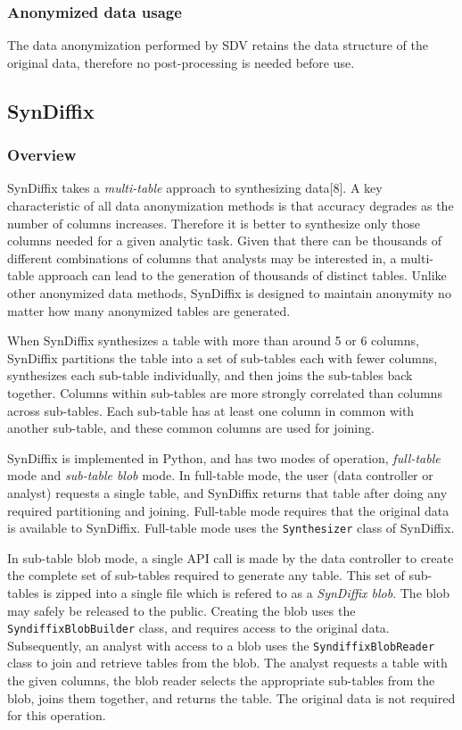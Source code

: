 \documentclass[10pt]{article}
\newcommand{\mycite}[1]{[#1]}
\begin{document}
\subsubsection*{Anonymized data usage}

The data anonymization performed by SDV retains the data structure of the original data, therefore no post-processing is needed before use.

\subsection*{SynDiffix}
\label{sec:method_sdx}

\subsubsection*{Overview}

SynDiffix takes a \textit{multi-table} approach to synthesizing data\mycite{8}. A key characteristic of all data anonymization methods is that accuracy degrades as the number of columns increases. Therefore it is better to synthesize only those columns needed for a given analytic task. Given that there can be thousands of different combinations of columns that analysts may be interested in, a multi-table approach can lead to the generation of thousands of distinct tables. Unlike other anonymized data methods, SynDiffix is designed to maintain anonymity no matter how many anonymized tables are generated.

When SynDiffix synthesizes a table with more than around 5 or 6 columns, SynDiffix partitions the table into a set of sub-tables each with fewer columns, synthesizes each sub-table individually, and then joins the sub-tables back together. Columns within sub-tables are more strongly correlated than columns across sub-tables. Each sub-table has at least one column in common with another sub-table, and these common columns are used for joining.

SynDiffix is implemented in Python, and has two modes of operation, \textit{full-table} mode and \textit{sub-table blob} mode. In full-table mode, the user (data controller or analyst) requests a single table, and SynDiffix returns that table after doing any required partitioning and joining. Full-table mode requires that the original data is available to SynDiffix. Full-table mode uses the \texttt{Synthesizer} class of SynDiffix.

In sub-table blob mode, a single API call is made by the data controller to create the complete set of sub-tables required to generate any table. This set of sub-tables is zipped into a single file which is refered to as a \textit{SynDiffix blob}. The blob may safely be released to the public. Creating the blob uses the \texttt{SyndiffixBlobBuilder} class, and requires access to the original data. Subsequently, an analyst with access to a blob uses the \texttt{SyndiffixBlobReader} class to join and retrieve tables from the blob. The analyst requests a table with the given columns, the blob reader selects the appropriate sub-tables from the blob, joins them together, and returns the table. The original data is not required for this operation.
\end{document}
